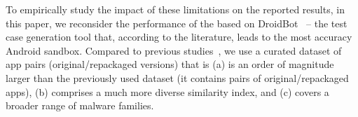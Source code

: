 
To empirically study the impact of these limitations on the reported results, in this paper, we reconsider the performance of the \mas based on DroidBot~\cite{DBLP:conf/icse/LiYGC17} -- the test case generation tool that, according to the literature, leads to the most accuracy Android sandbox. 
Compared to previous studies~\cite{DBLP:conf/wcre/BaoLL18,DBLP:conf/scam/CostaMCMVBC20},
we use a curated dataset of app pairs (original/repackaged versions) that is 
(a) is an order of magnitude larger than the previously used dataset (it contains \apps pairs of original/repackaged apps), 
(b) comprises a much more diverse similarity index, and 
(c) covers a broader range of malware families. 
 
